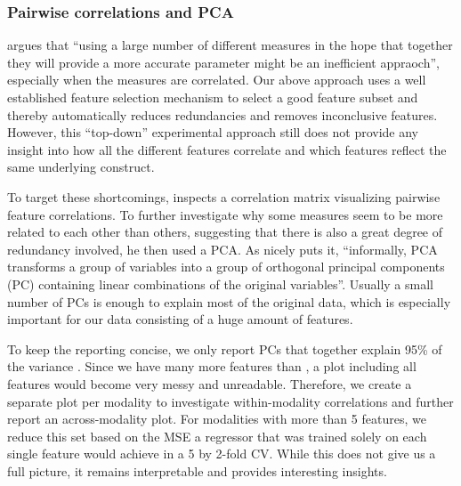 \documentclass[output=paper]{langsci/langscibook}
\begin{document}
\subsubsection{Pairwise correlations and PCA}
\label{sec:corr:PCA}
\citet{vieira2016measures} argues that ``using a large number of different measures in the hope that together they will provide a more accurate parameter might be an inefficient appraoch'', especially when the measures are correlated. Our above approach uses a well established feature selection mechanism to select a good feature subset and thereby automatically reduces redundancies and removes inconclusive features. However, this ``top-down'' experimental approach still does not provide any insight into how all the different features correlate and which features reflect the same underlying construct. %

To target these shortcomings, \citet{vieira2016measures} inspects a correlation matrix visualizing pairwise feature correlations. To further investigate why some measures seem to be more related to each other than others, suggesting that there is also a great degree of redundancy involved, he then used a PCA. As \citet{vieira2016measures} nicely puts it, ``informally, PCA transforms a group of variables into a group of orthogonal principal components (PC) containing linear combinations of the original variables''. Usually a small number of PCs is enough to explain most of the original data, which is especially important for our data consisting of a huge amount of features.

To keep the reporting concise, we only report PCs that together explain 95\% of the variance%
.
Since we have many more features than \citet{vieira2016measures}, a plot including all features would become very messy and unreadable. Therefore, we create a separate plot per modality to investigate within-modality correlations and further report an across-modality plot. For modalities with more than 5 features, we reduce this set based on the MSE a regressor that was trained solely on each single feature would achieve in a 5 by 2-fold CV. While this does not give us a full picture, it remains interpretable and provides interesting insights.
\end{document}
